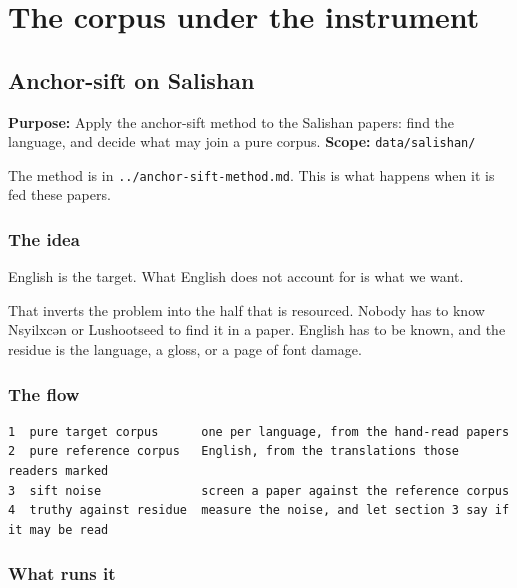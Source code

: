 \chapter{The corpus under the instrument}

\section{Anchor-sift on Salishan}

\textbf{Purpose:} Apply the anchor-sift method to the Salishan papers: find the language, and decide what may join a pure corpus. \textbf{Scope:} \texttt{data/\allowbreak{}salishan/\allowbreak{}}

The method is in \texttt{.\allowbreak{}.\allowbreak{}/\allowbreak{}anchor-\allowbreak{}sift-\allowbreak{}method.\allowbreak{}md}. This is what happens when it is fed these papers.

\subsection{The idea}

English is the target. What English does not account for is what we want.

That inverts the problem into the half that is resourced. Nobody has to know Nsyilxcən or Lushootseed to find it in a paper. English has to be known, and the residue is the language, a gloss, or a page of font damage.

\subsection{The flow}

\begin{lstlisting}[breaklines=true,breakatwhitespace=false,basicstyle=\ttfamily\small]
1  pure target corpus      one per language, from the hand-read papers
2  pure reference corpus   English, from the translations those readers marked
3  sift noise              screen a paper against the reference corpus
4  truthy against residue  measure the noise, and let section 3 say if it may be read
\end{lstlisting}

\subsection{What runs it}


